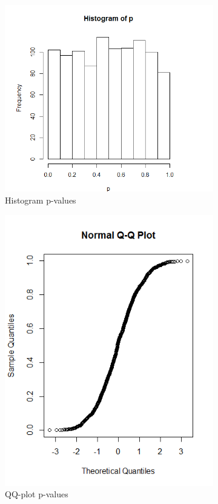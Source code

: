 \documentclass{article}
\begin{document}
      \begin{figure}[!htb]
      \begin{subfigure}{.5\textwidth}
        \centering
        \includegraphics[width=.8\linewidth]{results/2_2}
        \caption{Histogram p-values}
        \end{subfigure}
        \begin{subfigure}{.5\textwidth}
        \centering
        \includegraphics[width=.8\linewidth]{results/2_2_2}
        \caption{QQ-plot p-values}
        \end{subfigure}
        \caption{}
        \label{fig:2_2}
      \end{figure}
      
\end{document}
